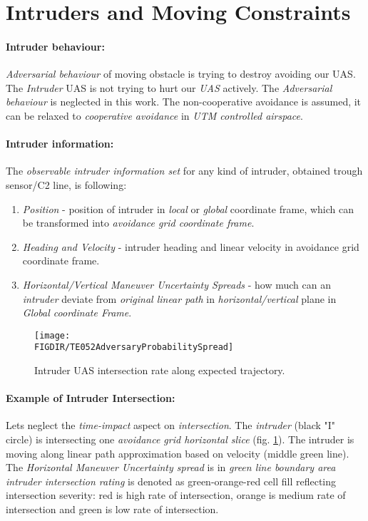 \cleardoublepage
\section{Intruders and Moving Constraints}\label{s:intruders}
\paragraph{Intruder behaviour:} \emph{Adversarial behaviour} of moving obstacle is trying to destroy avoiding our UAS.  The \emph{Intruder} UAS \cite{fiorini1998motion} is not trying to hurt our \emph{UAS} actively. The \emph{Adversarial behaviour} is neglected in this work. The non-cooperative avoidance is assumed, it can be relaxed to \emph{cooperative avoidance} in \emph{UTM controlled airspace}.

\paragraph{Intruder information:} The \emph{observable intruder information set} for any kind of intruder, obtained trough sensor/C2 line, is following:
\begin{enumerate}
    \item\emph{Position} - position of intruder in \emph{local} or \emph{global} coordinate frame, which can be transformed into \emph{avoidance grid coordinate frame}.
    
    \item\emph{Heading and Velocity} - intruder heading and linear velocity in avoidance grid coordinate frame.
    
    \item\emph{Horizontal/Vertical Maneuver Uncertainty Spreads} - how much can an \emph{intruder} deviate from \emph{original linear path} in \emph{horizontal/vertical} plane in \emph{Global coordinate Frame}.
\end{enumerate}

 

\begin{figure}[H]
    \centering
    \texttt{[image: \\FIGDIR/TE052AdversaryProbabilitySpread]}
    \caption{Intruder UAS intersection rate along expected trajectory.}
    \label{fig:intruderProbabiltySpreadTheoretical}
\end{figure}   

\paragraph{Example of Intruder Intersection:} Lets neglect the \emph{time-impact} aspect on \emph{intersection}.  The \emph{intruder} (black "I" circle) is intersecting one \emph{avoidance grid horizontal slice} (fig. \ref{fig:intruderProbabiltySpreadTheoretical}).  The intruder is moving along linear path approximation based on velocity (middle green line). The \emph{Horizontal Maneuver Uncertainty spread} is in \emph{green line boundary area} \emph{intruder intersection rating} is denoted as green-orange-red cell fill reflecting intersection severity:  red is high rate of intersection, orange is medium rate of intersection and green is low rate of intersection.
    


